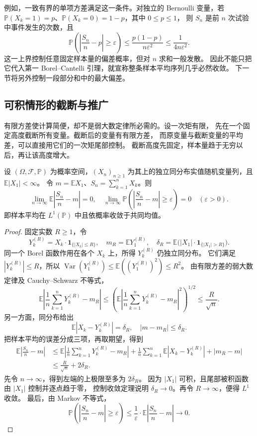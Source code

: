 例如，一致有界的单项方差满足这一条件。对独立的 Bernoulli 变量，若
\(\mathbb P(X_k=1)=p\)、\(\mathbb P(X_k=0)=1-p\)，其中 \(0\leq p\leq1\)，
则 \(S_n\) 是前 \(n\) 次试验中事件发生的次数，且
\[
 \mathbb P\left(\left|\frac{S_n}{n}-p\right|\geq\varepsilon\right)
 \leq\frac{p(1-p)}{n\varepsilon^2}
 \leq\frac1{4n\varepsilon^2}.
\]
这一上界控制任意固定样本量的偏差概率，但对 \(n\) 求和一般发散。
因此不能只把它代入第一 Borel--Cantelli 引理，就宣称整条样本平均序列几乎必然收敛。
下一节将另外控制一段部分和中的最大偏差。

\subsection{可积情形的截断与推广}
\label{b1:subsec:300403}

有限方差使计算简便，却不是弱大数定律所必需的。设一次矩有限，
先在一个固定高度截断所有变量。截断后的变量有有限方差，
而原变量与截断变量的平均差，可以直接用它们的一次矩尾部控制。
截断高度先固定，样本量趋于无穷以后，再让该高度增大。

\begin{theorem}[可积变量的弱大数定律]
\label{b1:thm:30-integrable-weak-law}
设 \((\Omega,\mathcal F,\mathbb P)\) 为概率空间，\((X_n)_{n\geq1}\)
为其上的独立同分布实值随机变量列，且 \(\mathbb E|X_1|<\infty\)。
令 \(m=\mathbb E X_1\)、\(S_n=\sum_{k=1}^nX_k\)。则
\[
 \lim_{n\to\infty}\mathbb E\left|\frac{S_n}{n}-m\right|=0,
 \quad
 \lim_{n\to\infty}
 \mathbb P\left(\left|\frac{S_n}{n}-m\right|\geq\varepsilon\right)=0
 \quad(\varepsilon>0).
\]
即样本平均在 \(L^1(\mathbb P)\) 中且依概率收敛于共同均值。
\end{theorem}
\begin{proof}
固定实数 \(R\geq1\)，令
\[
 Y_k^{(R)}=X_k\cdot\mathbf1_{\{|X_k|\leq R\}},
 \quad
 m_R=\mathbb E Y_1^{(R)},
 \quad
 \delta_R=\mathbb E\bigl(|X_1|\cdot\mathbf1_{\{|X_1|>R\}}\bigr).
\]
同一个 Borel 函数作用在各个 \(X_k\) 上，所得 \(Y_k^{(R)}\) 仍独立同分布。
它们满足 \(|Y_k^{(R)}|\leq R\)，所以
\(\operatorname{Var}(Y_1^{(R)})\leq\mathbb E((Y_1^{(R)})^2)\leq R^2\)。
由有限方差的弱大数定律及 Cauchy--Schwarz 不等式，
\[
 \mathbb E\left|\frac1n\sum_{k=1}^nY_k^{(R)}-m_R\right|
 \leq\left(
  \mathbb E\left|\frac1n\sum_{k=1}^nY_k^{(R)}-m_R\right|^2
       \right)^{1/2}
 \leq\frac R{\sqrt n}.
\]
另一方面，同分布给出
\[
 \mathbb E|X_k-Y_k^{(R)}|=\delta_R,
 \quad |m-m_R|\leq\delta_R.
\]
把样本平均的误差分成三项，再取期望，得到
\[
 \begin{aligned}
 \mathbb E\left|\frac{S_n}{n}-m\right|
 &\leq\mathbb E\left|\frac1n\sum_{k=1}^nY_k^{(R)}-m_R\right|
       +\frac1n\sum_{k=1}^n\mathbb E|X_k-Y_k^{(R)}|+|m_R-m|\\
 &\leq\frac R{\sqrt n}+2\delta_R.
 \end{aligned}
\]
先令 \(n\to\infty\)，得到左端的上极限至多为 \(2\delta_R\)。
因为 \(|X_1|\) 可积，且尾部被积函数由 \(|X_1|\) 控制并逐点趋于零，
控制收敛定理说明 \(\delta_R\to0\)。再令 \(R\to\infty\)，便得 \(L^1\) 收敛。
最后，由 Markov 不等式，
\[
 \mathbb P\left(\left|\frac{S_n}{n}-m\right|\geq\varepsilon\right)
 \leq\frac1\varepsilon\cdot
       \mathbb E\left|\frac{S_n}{n}-m\right|\longrightarrow0.
\]
\end{proof}

